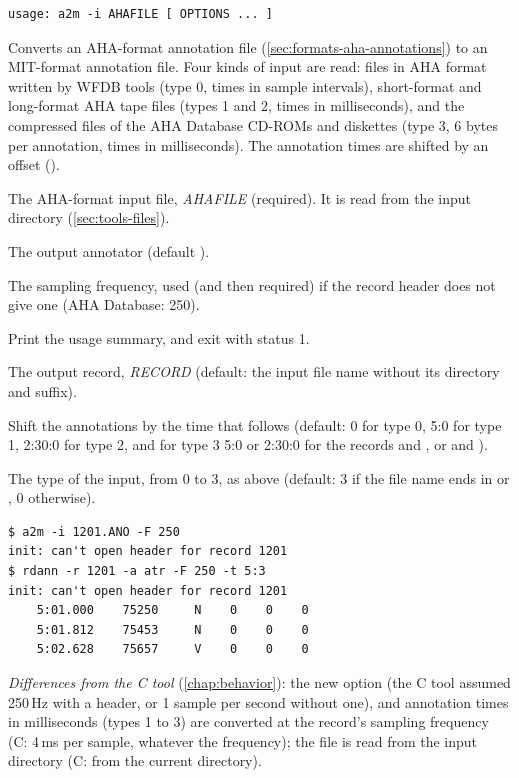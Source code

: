 \begin{lstlisting}[style=signature,language={}]
usage: a2m -i AHAFILE [ OPTIONS ... ]
\end{lstlisting}
Converts an AHA-format annotation file (\cref{sec:formats-aha-annotations}) to an MIT-format
annotation file. Four kinds of input are read: files in AHA format written by WFDB tools
(type 0, times in sample intervals), short-format and long-format AHA tape files (types 1
and 2, times in milliseconds), and the compressed files of the AHA Database CD-ROMs and
diskettes (type 3, 6 bytes per annotation, times in milliseconds). The annotation times are
shifted by an offset ().
\begin{params}
\item[-i] The AHA-format input file, \textit{AHAFILE} (required). It is read from the
  input directory (\cref{sec:tools-files}).
\item[-a] The output annotator (default ).
\item[-F] The sampling frequency, used (and then required) if the record header does not
  give one (AHA Database: 250).
\item[-h] Print the usage summary, and exit with status 1.
\item[-r] The output record, \textit{RECORD} (default: the input file name without its
  directory and suffix).
\item[-s] Shift the annotations by the time that follows (default: 0 for type 0, 5:0 for
  type 1, 2:30:0 for type 2, and for type 3 5:0 or 2:30:0 for the records  and
  , or  and ).
\item[-t] The type of the input, from 0 to 3, as above (default: 3 if the file name ends
  in  or , 0 otherwise).
\end{params}
\begin{lstlisting}[style=text]
$ a2m -i 1201.ANO -F 250
init: can't open header for record 1201
$ rdann -r 1201 -a atr -F 250 -t 5:3
init: can't open header for record 1201
    5:01.000    75250     N    0    0    0
    5:01.812    75453     N    0    0    0
    5:02.628    75657     V    0    0    0
\end{lstlisting}
\textit{Differences from the C tool} (\cref{chap:behavior}): the new option 
(the C tool assumed 250\,Hz with a header, or 1 sample per second without one), and
annotation times in milliseconds (types 1 to 3) are converted at the record's sampling
frequency (C: 4\,ms per sample, whatever the frequency); the  file is read from the
input directory (C: from the current directory).

